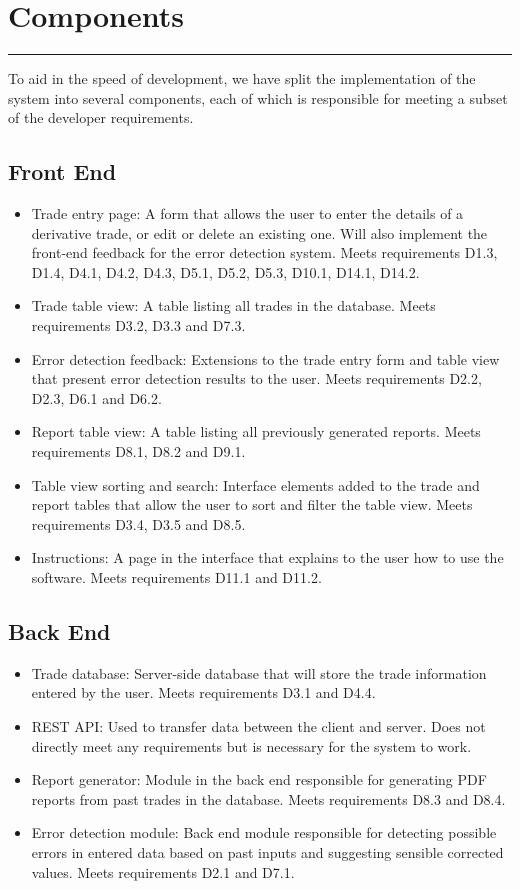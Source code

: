 \documentclass{article}
\begin{document}
\newpage
\section*{Components}
\hrule
\vspace{9pt}
To aid in the speed of development, we have split the implementation of the system into several components, each of which is responsible for meeting a subset of the developer requirements. 
\subsection*{Front End}
\begin{itemize}
    \item Trade entry page: A form that allows the user to enter the details of a derivative trade, or edit or delete an existing one. Will also implement the front-end feedback for the error detection system.  Meets requirements D1.3, D1.4, D4.1, D4.2, D4.3, D5.1, D5.2, D5.3, D10.1, D14.1, D14.2. 
    \item Trade table view: A table listing all trades in the database. Meets requirements D3.2, D3.3 and D7.3.  
    \item Error detection feedback: Extensions to the trade entry form and table view that present error detection results to the user. Meets requirements D2.2, D2.3, D6.1 and D6.2.
    \item Report table view: A table listing all previously generated reports. Meets requirements D8.1, D8.2 and D9.1.  
    \item Table view sorting and search: Interface elements added to the trade and report tables that allow the user to sort and filter the table view. Meets requirements D3.4, D3.5 and D8.5.  
    \item Instructions: A page in the interface that explains to the user how to use the software. Meets requirements D11.1 and D11.2. 
\end{itemize}

\subsection*{Back End}
\begin{itemize}
    \item Trade database: Server-side database that will store the trade information entered by the user.  Meets requirements D3.1 and D4.4.
    \item REST API: Used to transfer data between the client and server. Does not directly meet any requirements but is necessary for the system to work.
    \item Report generator: Module in the back end responsible for generating PDF reports from past trades in the database. Meets requirements D8.3 and D8.4. 
    \item Error detection module: Back end module responsible for detecting possible errors in entered data based on past inputs and suggesting sensible corrected values. Meets requirements D2.1 and D7.1. 
\end{itemize}
\end{document}
